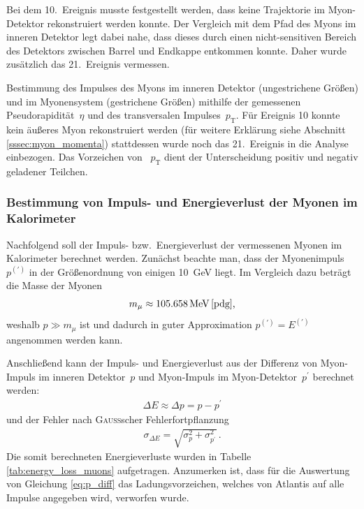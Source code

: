 \documentclass[11pt, a4paper]{article}
\numberwithin{equation}{section}
\begin{document}
Bei dem 10.\ Ereignis musste festgestellt werden, dass keine Trajektorie im Myon-Detektor rekonstruiert werden konnte.
Der Vergleich mit dem Pfad des Myons im inneren Detektor legt dabei nahe, dass dieses durch einen nicht-sensitiven Bereich des Detektors zwischen Barrel und Endkappe entkommen konnte.
Daher wurde zusätzlich das 21.\ Ereignis vermessen.


\begin{table}
	\centering
	
	\caption{Bestimmung des Impulses des Myons im inneren Detektor (ungestrichene Größen) und im Myonensystem (gestrichene Größen) mithilfe der gemessenen Pseudorapidität~$\eta$ und des transversalen Impulses~$p_\mathrm{T}$.
		Für Ereignis 10 konnte kein äußeres Myon rekonstruiert werden (für weitere Erklärung siehe Abschnitt \ref{sssec:myon_momenta}) stattdessen wurde noch das 21.\ Ereignis in die Analyse einbezogen.
		Das Vorzeichen von ~$p_\mathrm{T}$ dient der Unterscheidung positiv und negativ geladener Teilchen.}
	\label{tab:muon_momenta}
\end{table}

\subsubsection{Bestimmung von Impuls- und Energieverlust der Myonen im Kalorimeter}
Nachfolgend soll der Impuls- bzw.\ Energieverlust der vermessenen Myonen im Kalorimeter berechnet werden.
Zunächst beachte man, dass der Myonenimpuls~$p^{(\prime)}$ in der Größenordnung von einigen \SI{10}{\GeV} liegt.
Im Vergleich dazu beträgt die Masse der Myonen
\begin{align*}
	m_\mu \approx \SI{105.658}{\MeV} \, \cite{pdg} \text{,}
\end{align*}
weshalb $p \gg m_\mu$ ist und dadurch in guter Approximation $p^{(\prime)} = E^{(\prime)}$ angenommen werden kann.

Anschließend kann der Impuls- und Energieverlust aus der Differenz von Myon-Impuls im inneren Detektor~$p$ und Myon-Impuls im Myon-Detektor~$p^\prime$ berechnet werden:
\begin{align}
	\Delta E \approx \Delta p = p - p^\prime
	\label{eq:p_diff}
\end{align}
und der Fehler nach \textsc{Gauß}scher Fehlerfortpflanzung
\begin{align*}
	\sigma_{\Delta E} = \sqrt{\sigma_p^2 + \sigma_{p^\prime}^2} \, \text{.}
\end{align*}
Die somit berechneten Energieverluste wurden in Tabelle \ref{tab:energy_loss_muons} aufgetragen.
Anzumerken ist, dass für die Auswertung von Gleichung \eqref{eq:p_diff} das Ladungsvorzeichen, welches von Atlantis auf alle Impulse angegeben wird, verworfen wurde.
\end{document}
